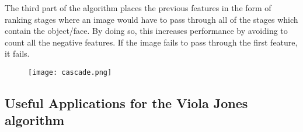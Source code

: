                 The third part of the algorithm places the previous
                features in the form of ranking stages where an image
                would have to pass through all of the stages which
                contain the object/face. By doing so, this increases
                performance by avoiding to count all the negative
                features. If the image fails to pass through the first
                feature, it fails.


            \begin{figure}[ht]
            \texttt{[image: cascade.png]}
            \centering
            \end{figure}

            \subsection{Useful Applications for the Viola Jones algorithm}
